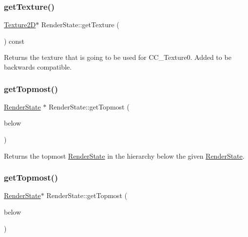 \subsubsection{\texorpdfstring{get\+Texture()}{getTexture()}\hspace{0.1cm}{\footnotesize\ttfamily [2/2]}}
{\footnotesize\ttfamily \hyperlink{classTexture2D}{Texture2D}$\ast$ Render\+State\+::get\+Texture (\begin{DoxyParamCaption}{ }\end{DoxyParamCaption}) const}

Returns the texture that is going to be used for C\+C\+\_\+\+Texture0. Added to be backwards compatible. \mbox{\label{classRenderState_a58585f74d7be453fcafb04924e06e157}} 
\subsubsection{\texorpdfstring{get\+Topmost()}{getTopmost()}\hspace{0.1cm}{\footnotesize\ttfamily [1/2]}}
{\footnotesize\ttfamily \hyperlink{classRenderState}{Render\+State} $\ast$ Render\+State\+::get\+Topmost (\begin{DoxyParamCaption}\item[{\hyperlink{classRenderState}{Render\+State} $\ast$}]{below }\end{DoxyParamCaption})}

Returns the topmost \hyperlink{classRenderState}{Render\+State} in the hierarchy below the given \hyperlink{classRenderState}{Render\+State}. \mbox{\label{classRenderState_ab69a68480517e64e4fee612ae57b408a}} 
\subsubsection{\texorpdfstring{get\+Topmost()}{getTopmost()}\hspace{0.1cm}{\footnotesize\ttfamily [2/2]}}
{\footnotesize\ttfamily \hyperlink{classRenderState}{Render\+State}$\ast$ Render\+State\+::get\+Topmost (\begin{DoxyParamCaption}\item[{\hyperlink{classRenderState}{Render\+State} $\ast$}]{below }\end{DoxyParamCaption})}

